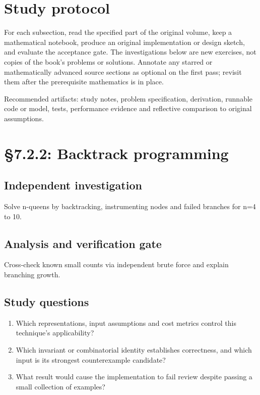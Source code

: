 \documentclass[11pt,letterpaper]{article}
\begin{document}
\tableofcontents
\clearpage
{}
\section{Study protocol}

For each subsection, read the specified part of the original volume, keep a mathematical notebook, produce an original implementation or design sketch, and evaluate the acceptance gate. The investigations below are new exercises, not copies of the book's problems or solutions. Annotate any starred or mathematically advanced source sections as optional on the first pass; revisit them after the prerequisite mathematics is in place.
\begin{evidencebox}Recommended artifacts: study notes, problem specification, derivation, runnable code or model, tests, performance evidence and reflective comparison to original assumptions.\end{evidencebox}

\section{\S 7.2.2: Backtrack programming}
\subsection{Independent investigation}
Solve n-queens by backtracking, instrumenting nodes and failed branches for n=4 to 10.
\subsection{Analysis and verification gate}
Cross-check known small counts via independent brute force and explain branching growth.
\subsection{Study questions}
\begin{enumerate}
\item Which representations, input assumptions and cost metrics control this technique's applicability?
\item Which invariant or combinatorial identity establishes correctness, and which input is its strongest counterexample candidate?
\item What result would cause the implementation to fail review despite passing a small collection of examples?
\end{enumerate}
\end{document}
